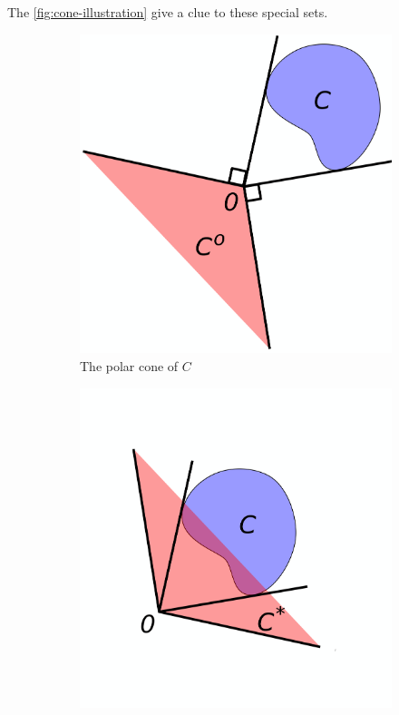 \documentclass{beamerswitch}
\begin{document}
The \autoref{fig:cone-illustration} give a clue to these special sets.
\begin{figure}[h!]
    \centering
    \begin{subfigure}[b]{0.3\textwidth}
        \centering
        \includegraphics[width=1\linewidth]{figs/Polar_cone_illustration.png}
        \caption{The polar cone of \(C\)}
        \label{fig:polar-cone}
    \end{subfigure}
    \begin{subfigure}[b]{0.3\textwidth}
        \centering
        \includegraphics[width=1\linewidth]{figs/Dual_cone_illustration.png}

\end{subfigure}
\end{figure}
\end{document}
